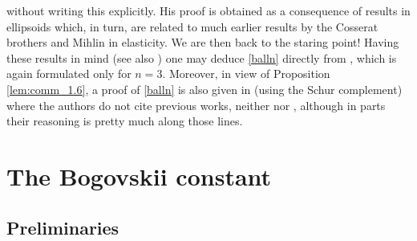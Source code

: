 \documentclass[11pt]{article}
\theoremstyle{plain}
\theoremstyle{definition}
\numberwithin{equation}{section}
\begin{document}
without writing this explicitly. His proof is obtained as a consequence of results in ellipsoids which, in turn, are related to much
earlier results by the Cosserat brothers \cite{Cosserat_18987,Cosserat_18986} and Mihlin \cite{Mihlin} in elasticity. We are then back to
the staring point! Having these results in mind (see also \cite{Simader_vonWahl_2006}) one may deduce \eqref{balln} directly from
\cite[Theorem 2]{Velte_LNM1431_1990}, which is again formulated only for $n=3$. Moreover, in view of Proposition \ref{lem:comm_1.6}, a proof
of \eqref{balln} is also given in \cite[Corollary 6]{gaultier1996spectral} (using the Schur complement) where the authors do not cite previous works, neither
\cite{Cosserat_18986} nor \cite{Velte_LNM1431_1990}, although in parts their reasoning is pretty much along those lines.\par\bigskip

\section{The Bogovskii constant}\label{sec:varkiational}

\subsection{Preliminaries}\label{sec:basics}
\end{document}

